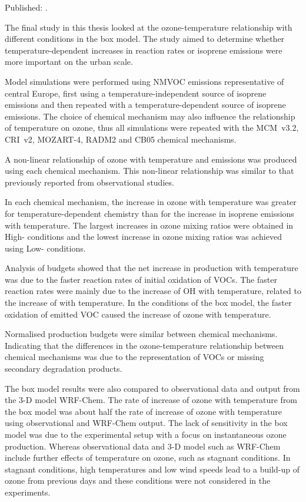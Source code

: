 Published: .
\vspace{5mm}

The final study in this thesis looked at the ozone-temperature relationship with different  conditions in the box model.
The study aimed to determine whether temperature-dependent increases in reaction rates or isoprene emissions were more important on the urban scale.

Model simulations were performed using NMVOC emissions representative of central Europe, first using a temperature-independent source of isoprene emissions and then repeated with a temperature-dependent source of isoprene emissions.
The choice of chemical mechanism may also influence the relationship of temperature on ozone, thus all simulations were repeated with the MCM~v3.2, CRI~v2, MOZART-4, RADM2 and CB05 chemical mechanisms.

A non-linear relationship of ozone with temperature and  emissions was produced using each chemical mechanism. 
This non-linear relationship was similar to that previously reported from observational studies.

In each chemical mechanism, the increase in ozone with temperature was greater for temperature-dependent chemistry than for the increase in isoprene emissions with temperature.
The largest increases in ozone mixing ratios were obtained in High- conditions and the lowest increase in ozone mixing ratios was achieved using Low- conditions.

Analysis of  budgets showed that the net increase in  production with temperature was due to the faster reaction rates of initial oxidation of VOCs.
The faster reaction rates were mainly due to the increase of OH with temperature, related to the increase of  with temperature.
In the conditions of the box model, the faster oxidation of emitted VOC caused the increase of ozone with temperature.

Normalised  production budgets were similar between chemical mechanisms.
Indicating that the differences in the ozone-temperature relationship between chemical mechanisms was due to the representation of VOCs or missing secondary degradation products.

The box model results were also compared to observational data and output from the 3-D model WRF-Chem.
The rate of increase of ozone with temperature from the box model was about half the rate of increase of ozone with temperature using observational and WRF-Chem output.
The lack of sensitivity in the box model was due to the experimental setup with a focus on instantaneous ozone production.
Whereas observational data and 3-D model such as WRF-Chem include further effects of temperature on ozone, such as stagnant conditions.
In stagnant conditions, high temperatures and low wind speeds lead to a build-up of ozone from previous days and these conditions were not considered in the experiments.
